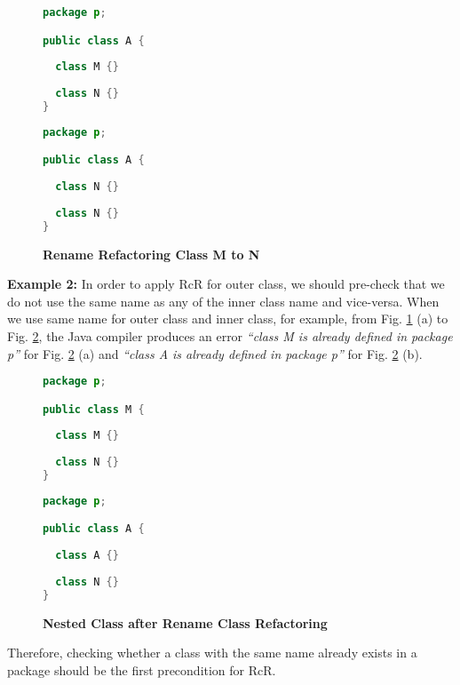 \begin{figure}[th]
\centering
\begin{minipage}[t]{0.45\linewidth}
\begin{lstlisting}[language=java, basicstyle=\scriptsize\ttfamily,frame=single]
package p;

public class A {	
  
  class M {}
	
  class N {}
} 
\end{lstlisting}
\end{minipage}
\hfill
\begin{minipage}[t]{0.45\linewidth}
\begin{lstlisting}[language=java, basicstyle=\scriptsize\ttfamily,frame=single]
package p;

public class A {	
    
  class N {}
    
  class N {}
} 
\end{lstlisting}
\end{minipage}
\caption{\textbf{Rename Refactoring Class M to N}}
\label{figure:nestedclass1}
\end{figure}


\textbf{Example 2:} In order to apply RcR for outer class, we should pre-check that we do not use the same name as any of the inner class name and vice-versa. 
When we use same name for outer class and inner class, for example, from Fig. \ref{figure:nestedclass1} (a) to Fig. \ref{figure:nestedclass2},  the Java compiler produces an error \textit{``class M is already defined in package p''} for Fig. \ref{figure:nestedclass2} (a) and \textit{``class A is already defined in package p''} for Fig. \ref{figure:nestedclass2} (b).

\begin{figure}[th]
\centering
\begin{minipage}[t]{0.45\linewidth}
\begin{lstlisting}[language=java, basicstyle=\scriptsize\ttfamily,frame=single]
package p;

public class M {	
  
  class M {}
	
  class N {}
} 
\end{lstlisting}
\end{minipage}
\hfill
\begin{minipage}[t]{0.45\linewidth}
\begin{lstlisting}[language=java, basicstyle=\scriptsize\ttfamily,frame=single]
package p;

public class A {	
    
  class A {}
    
  class N {}
} 
\end{lstlisting}
\end{minipage}
\caption{\textbf{Nested Class after Rename Class Refactoring}}
\label{figure:nestedclass2}
\end{figure}

Therefore, checking whether a class with the same name already exists in a package should be the first precondition for RcR. 
   
